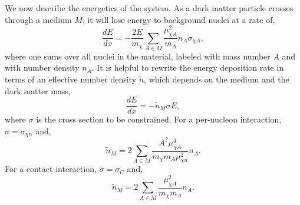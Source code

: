 \documentclass[12pt]{article}
\begin{document}
We now describe the energetics of the system. As a dark matter particle crosses through a medium $M$, it will lose energy to background nuclei at a rate of,
\begin{equation}
    \frac{dE}{dx} = -\frac{2E}{m_\chi} \sum_{A\in M} \frac{\mu_{\chi A}^2}{m_A} n_A \sigma_{\chi A},
\end{equation}
where one sums over all nuclei in the material, labeled with mass number $A$ and with number density $n_A$.
It is helpful to rewrite the energy deposition rate in terms of an effective number density $\tilde{n}$, which depends on the medium and the dark matter mass,
    \begin{equation} \label{eq:energyLoss}
    \frac{dE}{dx} = -\tilde{n}_M\sigma E,
\end{equation}
where $\sigma$ is the cross section to be constrained. For a per-nucleon interaction, $\sigma = \sigma_{\chi n}$ and,
\begin{equation} \label{eq:densPN}
    \tilde{n}_{M}  = 2\sum_{A\in M} \frac{A^2\mu_{\chi A}^4}{m_\chi m_A\mu_{\chi n}^2} n_A.
\end{equation}
For a contact interaction, $\sigma = \sigma_{C}$ and,
\begin{equation}\label{eq:densCON}
    \tilde{n}_{M}  = 2\sum_{A\in M} \frac{\mu_{\chi A}^2}{m_\chi m_A} n_A.
\end{equation}
\end{document}
